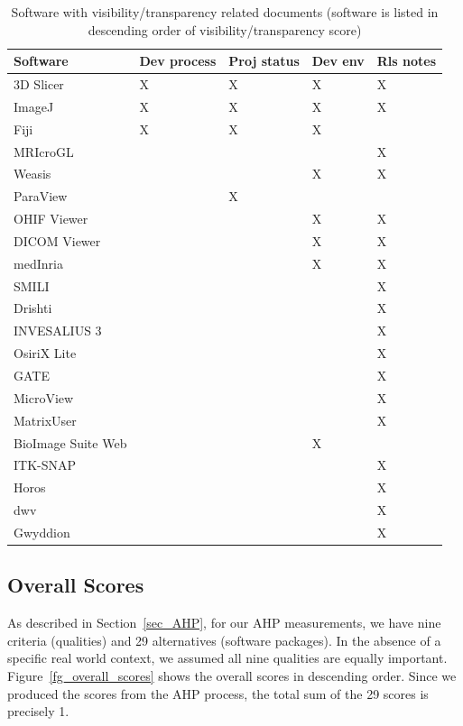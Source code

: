 \documentclass[final, 3p, times, authoryear]{elsarticle}
\begin{document}
\begin{table}[!ht]
\centering
\begin{tabular}{lllll}
\toprule
Software & Dev process & Proj status & Dev env & Rls notes \\ 
\midrule
3D Slicer & X & X & X & X \\
ImageJ & X & X & X & X \\
Fiji & X & X & X &  \\
MRIcroGL &  &  &  & X \\
Weasis &  &  & X & X \\
ParaView &  & X &  &  \\
OHIF Viewer &  &  & X & X \\
DICOM Viewer &  &  & X & X \\
medInria &  &  & X & X \\
SMILI &  &  &  & X \\
Drishti &  &  &  & X \\
INVESALIUS 3 &  &  &  & X \\
OsiriX Lite &  &  &  & X \\
GATE &  &  &  & X \\
MicroView &  &  &  & X \\
MatrixUser &  &  &  & X \\
BioImage Suite Web &  &  & X &  \\
ITK-SNAP &  &  &  & X \\
Horos &  &  &  & X \\
dwv &  &  &  & X \\
Gwyddion &  &  &  & X \\ 
\bottomrule
\end{tabular}
\caption{Software with visibility/transparency related documents (software is
listed in descending order of visibility/transparency score)}
\label{tab_Visibility/Transparency_docs}
\end{table}

\subsection{Overall Scores}

As described in Section~\ref{sec_AHP}, for our AHP measurements, we have nine
criteria (qualities) and 29 alternatives (software packages). In the absence of
a specific real world context, we assumed all nine qualities are equally
important. Figure~\ref{fg_overall_scores} shows the overall scores in descending
order. Since we produced the scores from the AHP process, the total sum of the
29 scores is precisely 1.
\end{document}
